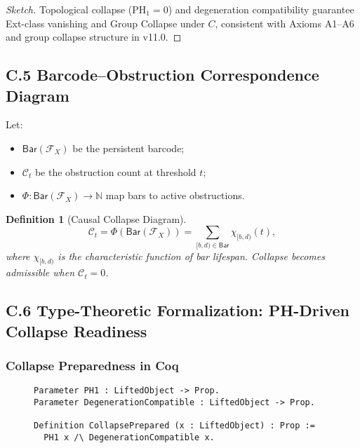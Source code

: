 \documentclass[11pt]{article}
\newtheorem{definition}[theorem]{Definition}
\begin{document}
\begin{proof}[Sketch]
Topological collapse (\( \mathrm{PH}_1 = 0 \)) and degeneration compatibility guarantee Ext-class vanishing and Group Collapse under \( C \), consistent with Axioms A1–A6 and group collapse structure in v11.0.
\end{proof}

\subsection*{C.5 Barcode–Obstruction Correspondence Diagram}

Let:

\begin{itemize}
    \item \( \mathsf{Bar}(\mathcal{F}_X) \) be the persistent barcode;
    \item \( \mathcal{C}_t \) be the obstruction count at threshold \( t \);
    \item \( \Phi : \mathsf{Bar}(\mathcal{F}_X) \to \mathbb{N} \) map bars to active obstructions.
\end{itemize}

\begin{definition}[Causal Collapse Diagram]
\[
\mathcal{C}_t = \Phi(\mathsf{Bar}(\mathcal{F}_X)) = \sum_{[b,d) \in \mathsf{Bar}} \chi_{[b,d)}(t),
\]
where \( \chi_{[b,d)} \) is the characteristic function of bar lifespan. Collapse becomes admissible when \( \mathcal{C}_t = 0 \).
\end{definition}

\subsection*{C.6 Type-Theoretic Formalization: PH-Driven Collapse Readiness}

\subsubsection*{Collapse Preparedness in Coq}

\begin{figure}[h]
\centering
\begin{lstlisting}[language=Coq, caption=Persistent Homology Driven Collapse Readiness]
Parameter PH1 : LiftedObject -> Prop.
Parameter DegenerationCompatible : LiftedObject -> Prop.

Definition CollapsePrepared (x : LiftedObject) : Prop :=
  PH1 x /\ DegenerationCompatible x.
\end{lstlisting}
\end{figure}
\end{document}
